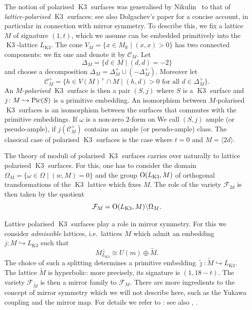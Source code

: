 \documentclass[a4paper,11pt]{article}
\newcommand{\RR}{\mathbb R}
\newcommand{\cC}{\mathcal C}
\newcommand{\cF}{\mathcal F}
\newcommand{\emb}{\hookrightarrow}
\renewcommand{\Tilde}{\widetilde}
\newcommand{\Orth}{\mathop{\null\mathrm {O}}\nolimits}
\newcommand{\Pic}{\mathop{\null\mathrm {Pic}}\nolimits}
\newcommand{\latt}[1]{{\langle{#1}\rangle}}
\newcommand{\Kthree}{\mathop{\mathrm {K3}}\nolimits}
\begin{document}
The notion of polarised $\Kthree$ surfaces was generalised by
Nikulin~\cite{Nik1}
to that of \emph{lattice-polarised}
$\Kthree$ surfaces: see also Dolgachev's paper \cite{Dol} for a
concise account, in particular in connection with mirror symmetry.  To
describe this, we fix a lattice $M$ of signature $(1,t)$, which we
assume can be embedded primitively into the $\Kthree$-lattice
$L_{\Kthree}$. The cone $V_M= \{ x \in M_{\RR} \mid (x,x)>0 \}$ has
two connected components: we fix one and denote it by $\cC_M$. Let
\begin{equation*}
\Delta_M=\{ d\in M \mid (d,d)=-2 \}
\end{equation*}
and choose a decomposition $\Delta_M = \Delta_M^+ \cup
(-\Delta_M^+)$. Moreover let
\begin{equation*}
\cC_M^+= \{h \in V(M)^+ \cap M \mid (h,d) > 0 \mbox{ for all } d\in
\Delta_M^+ \}.
\end{equation*}
An \emph{$M$-polarised} $\Kthree$ surface is then a pair $(S,j)$ where
$S$ is a $\Kthree$ surface and $j\colon M \emb \Pic(S)$ is a primitive
embedding.  An isomorphism between $M$-polarised $\Kthree$ surfaces is
an isomorphism between the surfaces that commutes with the primitive
embeddings. If $\omega$ is a non-zero $2$-form on We call $(S,j)$
ample (or pseudo-ample), if $j(\cC_M^+)$ contains an ample (or
pseudo-ample) class. The classical case of polarised $\Kthree$
surfaces is the case where $t=0$ and $M=\latt{2d}$.

The theory of moduli of polarised $\Kthree$ surfaces carries over
naturally to lattice polarised $\Kthree$ surfaces.  For this, one has
to consider the domain $\Omega_M= \{ \omega \in \Omega \mid (w,M)=0
\}$ and the group $\Orth(L_{\Kthree},M)$ of orthogonal transformations
of the $\Kthree$ lattice which fixes $M$.  The role of the variety
$\cF_{2d}$ is then taken by the quotient
\begin{equation}\label{latticepol}
\cF_M= \Orth(L_{\Kthree},M) \backslash \Omega_M.
\end{equation}

Lattice polarised $\Kthree$ surfaces play a role in mirror
symmetry. For this we consider \emph{admissible} lattices,
i.e.\ lattices $M$ which admit an embedding $j\colon M \emb L_{\Kthree}
$ such that
\begin{equation*}
M^{\perp}_{L_{\Kthree}} \cong U(m) \oplus \Tilde{M}.
\end{equation*}
The choice of such a splitting determines a primitive embedding
$\tilde{\jmath}\colon \Tilde{M} \emb L_{\Kthree}$.  The lattice
$\Tilde{M}$ is hyperbolic: more precisely, its signature is $(1,
18-t)$.  The variety $\cF_{\Tilde{M}}$ is then a mirror family to
$\cF_M$. There are more ingredients to the concept of mirror symmetry
which we will not describe here, such as the Yukawa coupling and the
mirror map.  For details we refer to \cite{Dol}: see also \cite{GN4}, \cite{GN5}.
\end{document}
